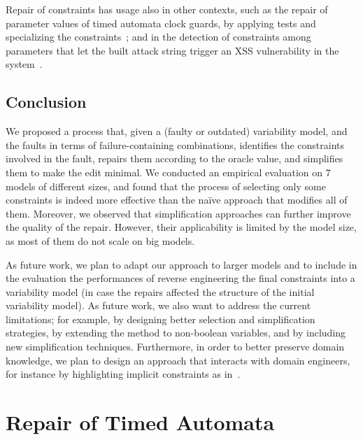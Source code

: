 \begin{tikzborder}{\cite{Gargantini16:validation}}
\begin{tikzborder}{\cite{gargantini_combinatorial_2017}}
\begin{tikzborder}{\cite{gargantini_combinatorial_2017}}
\begin{tikzborder}{\cite{garn2019}}
\begin{tikzborder}{\cite{arcaini2019achieving}}
\begin{tikzborder}{\cite{arcaini2019varivolution}}
		Repair of constraints has usage also in other contexts, such as the repair of parameter values of timed automata clock guards, by applying tests and specializing the constraints~\cite{andre_tap_2019}; and in the detection of constraints among parameters that let the built attack string trigger an XSS vulnerability in the system~\cite{garn2019}.\be
		
		\section{Conclusion}\label{sec:fmconclusion}
		
		\bb We proposed a process that, given a (faulty or outdated) variability model, and the faults in terms of failure-containing combinations, identifies the constraints involved in the fault, repairs them according to the oracle value, and simplifies them to make the edit minimal. We conducted an empirical evaluation on 7 models of different sizes, and found that the process of selecting only some constraints is indeed more effective than the na{\"i}ve approach that modifies all of them. Moreover, we observed that simplification approaches can further improve the quality of the repair. However, their applicability is limited by the model size, as most of them do not scale on big models.
		
		As future work, we plan to adapt our approach to larger models and to include in the evaluation the performances of reverse engineering the final constraints into a variability model (in case the repairs affected the structure of the initial variability model). As future work, we also want to address the current limitations; for example, by designing better selection and simplification strategies, by extending the method to non-boolean variables, and by including new simplification techniques. Furthermore, in order to better preserve domain knowledge, we plan to design an approach that interacts with domain engineers, for instance by highlighting implicit constraints as in~\cite{ananieva_implicit_2016}.\be


















\chapter{Repair of Timed Automata}\label{ch:tarepair}


\end{tikzborder}
\end{tikzborder}
\end{tikzborder}
\end{tikzborder}
\end{tikzborder}
\end{tikzborder}
